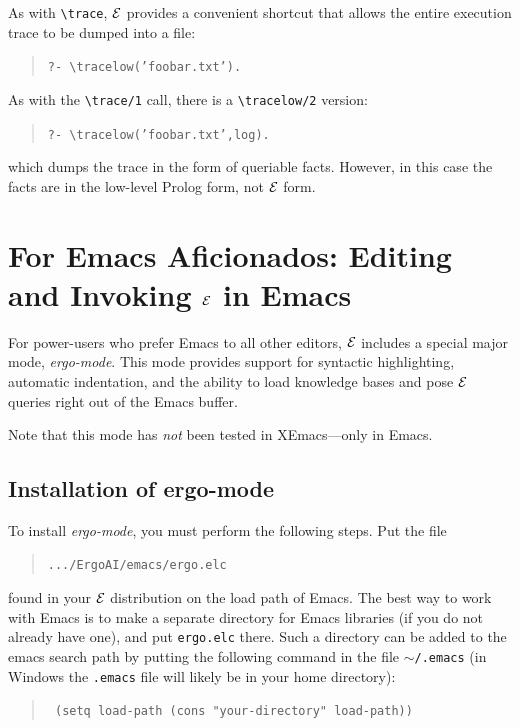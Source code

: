 \documentclass[11pt]{article}
\newcommand{\ERGO}{\mbox{\ensuremath{\cal{E}}\smaller{{\sc{RGO}}}}\xspace}
\newcommand{\FLSYSTEM}{\ERGO}
\newcommand{\ERGOMODE}{ergo-mode}
\newcommand{\ERGOFILE}{ergo.elc}
\newcommand{\bs}{\textbackslash}
\begin{document}
As with {\tt \bs{}trace}, \FLSYSTEM provides a convenient shortcut that allows
the entire execution trace to be dumped into a file:
\begin{quote}
 \tt     ?- \bs{}tracelow('foobar.txt').  
\end{quote}

As with the \texttt{\bs{}trace/1} call, there is a \texttt{\bs{}tracelow/2}   
version:
\begin{quote}
 \tt     ?- \bs{}tracelow('foobar.txt',log).  
\end{quote}
which dumps the trace in the form of queriable facts. However, in this case
the facts are in the low-level Prolog form, not \FLSYSTEM form.


\newpage
\section{For Emacs Aficionados: Editing and Invoking \FLSYSTEM in Emacs}

For power-users who prefer Emacs to all other editors, \FLSYSTEM includes a
special major mode, \emph{\ERGOMODE}.
This mode provides support for syntactic
highlighting, automatic indentation, and the ability to load knowledge
bases and pose \FLSYSTEM
queries right out of the Emacs buffer.

\noindent
Note that this mode has \emph{not} been tested in XEmacs---only in Emacs.


\subsection{Installation of ergo-mode}


To install \emph{\ERGOMODE}, you must perform the following steps. Put the
file
\begin{quote}
  {\tt .../ErgoAI/emacs/\ERGOFILE}
\end{quote}
found in your \FLSYSTEM distribution on the load path of Emacs.
The best way to work with Emacs is to make a
separate directory for Emacs libraries (if you do not already have one), and put
\texttt{\ERGOFILE}  there. Such a directory can be added to the emacs search path by
putting the following command in the file
\texttt{\ensuremath{\sim}/.emacs} (in Windows the \texttt{.emacs}
file will likely be in your home directory):
\begin{quote}
  \tt
   (setq load-path (cons "your-directory" load-path)) 
\end{quote}
\end{document}
